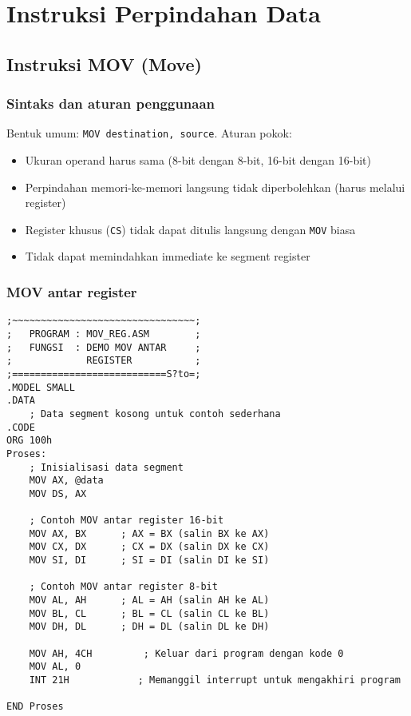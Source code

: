 \documentclass[../main.tex]{subfiles}
\begin{document}
    \section{Instruksi Perpindahan Data}

        \subsection{Instruksi MOV (Move)}
            \subsubsection{Sintaks dan aturan penggunaan}
Bentuk umum: \texttt{MOV destination, source}. Aturan pokok:
\begin{itemize}
    \item Ukuran operand harus sama (8-bit dengan 8-bit, 16-bit dengan 16-bit)
    \item Perpindahan memori-ke-memori langsung tidak diperbolehkan (harus melalui register)
    \item Register khusus (\texttt{CS}) tidak dapat ditulis langsung dengan \texttt{MOV} biasa
    \item Tidak dapat memindahkan immediate ke segment register
\end{itemize}

            \subsubsection{MOV antar register}
\begin{lstlisting}[language={[x86masm]Assembler}, caption=MOV antar Register, label={lst:mov-register}]
;~~~~~~~~~~~~~~~~~~~~~~~~~~~~~~~~;
;   PROGRAM : MOV_REG.ASM        ;
;   FUNGSI  : DEMO MOV ANTAR     ;
;             REGISTER           ;
;===========================S?to=;
.MODEL SMALL
.DATA
    ; Data segment kosong untuk contoh sederhana
.CODE
ORG 100h
Proses:
    ; Inisialisasi data segment
    MOV AX, @data
    MOV DS, AX
    
    ; Contoh MOV antar register 16-bit
    MOV AX, BX      ; AX = BX (salin BX ke AX)
    MOV CX, DX      ; CX = DX (salin DX ke CX)
    MOV SI, DI      ; SI = DI (salin DI ke SI)
    
    ; Contoh MOV antar register 8-bit
    MOV AL, AH      ; AL = AH (salin AH ke AL)
    MOV BL, CL      ; BL = CL (salin CL ke BL)
    MOV DH, DL      ; DH = DL (salin DL ke DH)
    
    MOV AH, 4CH         ; Keluar dari program dengan kode 0
    MOV AL, 0
    INT 21H            ; Memanggil interrupt untuk mengakhiri program

END Proses
\end{lstlisting}
\end{document}
